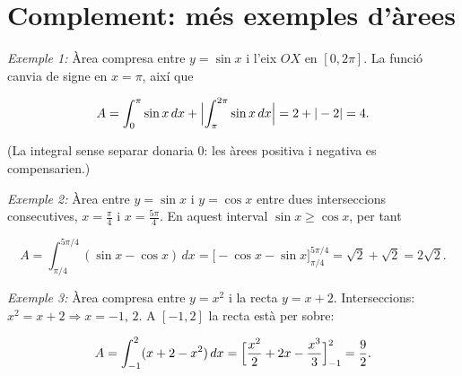 \section{Complement: més exemples d'àrees}

\emph{Exemple 1:} Àrea compresa entre $y=\sin x$ i l'eix $OX$ en $[0,2\pi]$. La funció canvia de signe en $x=\pi$, així que

\begin{equation*}
A=\int_0^{\pi}\sin x\,dx+\Bigl|\int_\pi^{2\pi}\sin x\,dx\Bigr|=2+|-2|=4.
\end{equation*}

(La integral sense separar donaria $0$: les àrees positiva i negativa es compensarien.)

\emph{Exemple 2:} Àrea entre $y=\sin x$ i $y=\cos x$ entre dues interseccions consecutives, $x=\frac\pi4$ i $x=\frac{5\pi}4$. En aquest interval $\sin x\ge\cos x$, per tant

\begin{equation*}
A=\int_{\pi/4}^{5\pi/4}(\sin x-\cos x)\,dx=\bigl[-\cos x-\sin x\bigr]_{\pi/4}^{5\pi/4}=\sqrt2+\sqrt2=2\sqrt2.
\end{equation*}

\emph{Exemple 3:} Àrea compresa entre $y=x^2$ i la recta $y=x+2$. Interseccions: $x^2=x+2\Rightarrow x=-1,\,2$. A $[-1,2]$ la recta està per sobre:

\begin{equation*}
A=\int_{-1}^{2}(x+2-x^2)\,dx=\Bigl[\frac{x^2}{2}+2x-\frac{x^3}{3}\Bigr]_{-1}^{2}=\frac{9}{2}.
\end{equation*}
